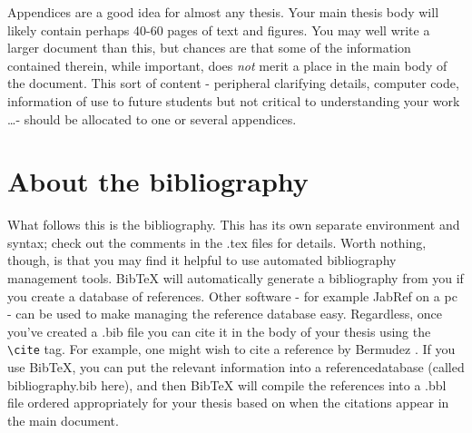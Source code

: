 
Appendices are a good idea for almost any thesis.  Your main thesis body will likely contain perhaps 40-60 pages of text and figures.  You may well write a larger document than this, but chances are that some of the information contained therein, while important, does \emph{not} merit a place in the main body of the document.  This sort of content - peripheral clarifying details, computer code, information of use to future students but not critical to understanding your work \ldots - should be allocated to one or several appendices.  


\section{About the bibliography}
What follows this is the bibliography.  This has its own separate environment and syntax; check out the comments in the .tex files for details.  Worth nothing, though, is that you may find it helpful to use automated bibliography management tools.  BibTeX will automatically generate a bibliography from you if you create a database of references.  Other software - for example JabRef on a pc - can be used to make managing the reference database easy.  Regardless, once you've created a .bib file you can cite it in the body of your thesis using the \texttt{\textbackslash cite} tag.  For example, one might wish to cite a reference by Bermudez \cite{Bermudez}.  If you use BibTeX, you can put the relevant information into a referencedatabase (called bibliography.bib here), and then BibTeX will compile the references into a .bbl file ordered appropriately for your thesis based on when the citations appear in the main document.